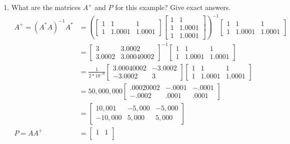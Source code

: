 \documentclass[12pt]{article}
\begin{document}
	\begin{enumerate}[label = (\alph*)]
		\item What are the matrices $A^+$ and $P$ for this example? Give exact answers.
			\begin{align*}
			A^+ = (A^*A)^{-1}A^* &=
			\left(
			\begin{bmatrix}
				1  &  1  &  1 \\
				1  &  1.0001  &  1.0001
			\end{bmatrix}
			\begin{bmatrix}
				1 & 1 \\
				1 & 1.0001 \\
				1 & 1.0001
			\end{bmatrix}
			\right)^{-1}
			\begin{bmatrix}
				1  &  1  &  1 \\
				1  &  1.0001  &  1.0001
			\end{bmatrix} \\
			&= 
			\begin{bmatrix}
				3 & 3.0002 \\
				3.0002 &  3.00040002
			\end{bmatrix}^{-1}
			\begin{bmatrix}
				1  &  1  &  1 \\
				1  &  1.0001  &  1.0001
			\end{bmatrix} \\
			&= \frac{1}{2 * 10^{-8}}
			\begin{bmatrix}
				3.00040002 & -3.0002 \\
				-3.0002 &  3
			\end{bmatrix}
			\begin{bmatrix}
				1  &  1  &  1 \\
				1  &  1.0001  &  1.0001
			\end{bmatrix} \\
			&= 50,000,000
			\begin{bmatrix}
				.00020002 & -.0001 & -.0001 \\
				-.0002 & .0001 & .0001
			\end{bmatrix} \\
			&= 
			\begin{bmatrix}
				10,001 & -5,000 & -5,000 \\
				-10,000 & 5,000 & 5,000
			\end{bmatrix} \\
			P = AA^+ &= 
			\begin{bmatrix}
				1 & 1 \\

\end{bmatrix}
\end{align*}
\end{enumerate}
\end{document}
